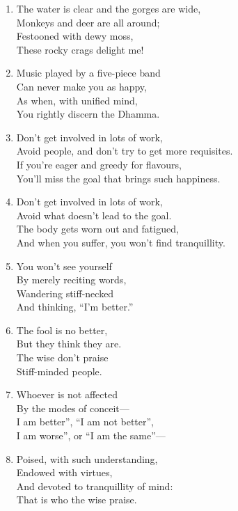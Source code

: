 \documentclass[10pt, openany]{book}
\newcommand*{\vleftofline}[1]{\leavevmode\llap{#1}}
\begin{document}
\begin{enumerate}
\item The water is clear and the gorges are wide,\\
Monkeys and deer are all around;\\
Festooned with dewy moss,\\
These rocky crags delight me!

\item Music played by a five-piece band\\
Can never make you as happy,\\
As when, with unified mind,\\
You rightly discern the Dhamma.

\item Don’t get involved in lots of work,\\
Avoid people, and don’t try to get more requisites.\\
If you’re eager and greedy for flavours,\\
You’ll miss the goal that brings such happiness.

\item Don’t get involved in lots of work,\\
Avoid what doesn’t lead to the goal.\\
The body gets worn out and fatigued,\\
And when you suffer, you won’t find tranquillity.

\item You won’t see yourself\\
By merely reciting words,\\
Wandering stiff-necked\\
And thinking, “I’m better.”

\item The fool is no better,\\
But they think they are.\\
The wise don’t praise\\
Stiff-minded people.

\item Whoever is not affected\\
By the modes of conceit—\\
\vleftofline{“}I am better”, “I am not better”,\\
\vleftofline{“}I am worse”, or “I am the same”—

\item Poised, with such understanding,\\
Endowed with virtues,\\
And devoted to tranquillity of mind:\\
That is who the wise praise.


\end{enumerate}
\end{document}
